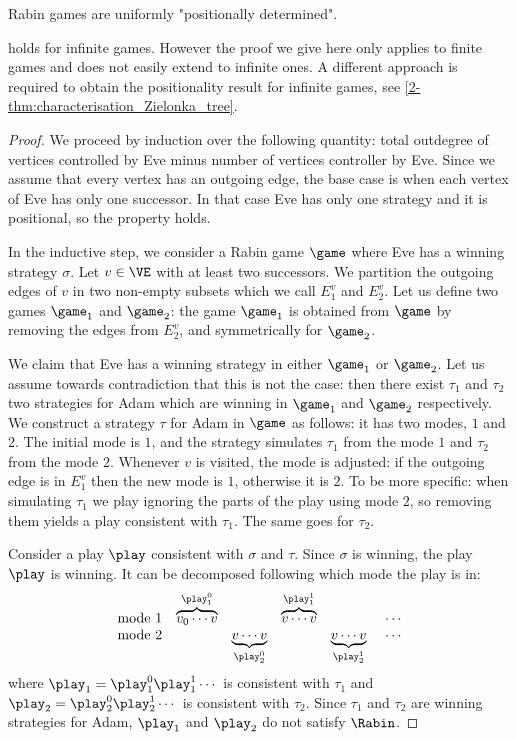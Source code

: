 \begin{theorem}\label{2-thm:Rabin_positional_determinacy}
Rabin games are uniformly "positionally determined".
\end{theorem}
 holds for infinite games.
However the proof we give here only applies to finite games and does not easily extend to infinite ones.
A different approach is required to obtain the positionality result for infinite games, see \cref{2-thm:characterisation_Zielonka_tree}.

\begin{proof}
We proceed by induction over the following quantity: total outdegree of vertices controlled by Eve minus number of vertices controller by Eve.
Since we assume that every vertex has an outgoing edge, the base case is when each vertex of Eve has only one successor. 
In that case Eve has only one strategy and it is positional, so the property holds.
    
In the inductive step, we consider a Rabin game $\game$ where Eve has a winning strategy $\sigma$.
Let $v \in \VE$ with at least two successors. 
We partition the outgoing edges of $v$ in two non-empty subsets which we call $E^v_1$ and $E^v_2$.
Let us define two games $\game_1$ and $\game_2$: the game $\game_1$ is obtained from $\game$ by removing the edges from $E^v_2$, and symmetrically for $\game_2$.

We claim that Eve has a winning strategy in either $\game_1$ or $\game_2$.
Let us assume towards contradiction that this is not the case: then there exist $\tau_1$ and $\tau_2$ two strategies for Adam
which are winning in $\game_1$ and $\game_2$ respectively.
We construct a strategy $\tau$ for Adam in $\game$ as follows: it has two modes, $1$ and $2$. The initial mode is $1$, and the strategy simulates $\tau_1$ from the mode $1$ and $\tau_2$ from the mode $2$. Whenever $v$ is visited, the mode is adjusted: if the outgoing edge is in $E^v_1$ then the new mode is $1$, otherwise it is $2$.
To be more specific: when simulating $\tau_1$ we play ignoring the parts of the play using mode $2$, so removing them yields a play consistent with $\tau_1$. The same goes for $\tau_2$.

Consider a play $\play$ consistent with $\sigma$ and $\tau$. 
Since $\sigma$ is winning, the play $\play$ is winning. It can be decomposed following which mode the play is in:
\[
\begin{array}{ccccccccc}
\text{mode } 1 & \overbrace{v_0 \cdots v}^{\play_1^0} & & 
\overbrace{v \cdots v}^{\play_1^1} & & \ \cdots \\
\text{mode } 2 && \underbrace{v \cdots v}_{\play_2^0} 
& & \underbrace{v \cdots v}_{\play_2^1} & \ \cdots
\end{array}
\]
where $\play_1 = \play_1^0 \play_1^1 \cdots$ is consistent with $\tau_1$ and $\play_2 = \play_2^0 \play_2^1 \cdots$ is consistent with $\tau_2$.
Since $\tau_1$ and $\tau_2$ are winning strategies for Adam, $\play_1$ and $\play_2$ do not satisfy $\Rabin$.


\end{proof}
